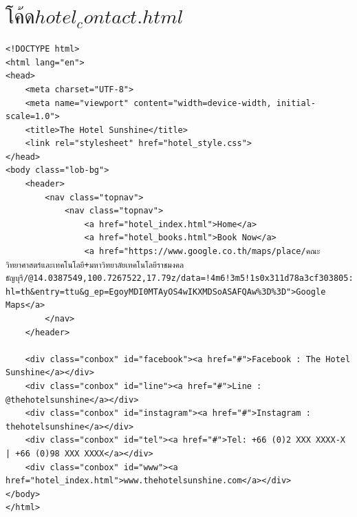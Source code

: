 \documentclass{report}
\begin{document}
\section{$โค้ดhotel_contact.html$}
\begin{verbatim}
<!DOCTYPE html>
<html lang="en">
<head>
    <meta charset="UTF-8">
    <meta name="viewport" content="width=device-width, initial-scale=1.0">
    <title>The Hotel Sunshine</title>
    <link rel="stylesheet" href="hotel_style.css">
</head>
<body class="lob-bg">
    <header>
        <nav class="topnav">
            <nav class="topnav">
                <a href="hotel_index.html">Home</a>
                <a href="hotel_books.html">Book Now</a>
                <a href="https://www.google.co.th/maps/place/คณะวิทยาศาสตร์และเทคโนโลยี+มหาวิทยาลัยเทคโนโลยีราชมงคลธัญบุรี/@14.0387549,100.7267522,17.79z/data=!4m6!3m5!1s0x311d78a3cf303805:0x298cef6207b64026!8m2!3d14.0395596!4d100.7289406!16s%2Fg%2F12nvpzlcn?hl=th&entry=ttu&g_ep=EgoyMDI0MTAyOS4wIKXMDSoASAFQAw%3D%3D">Google Maps</a>
        </nav>
    </header>

    <div class="conbox" id="facebook"><a href="#">Facebook : The Hotel Sunshine</a></div>
    <div class="conbox" id="line"><a href="#">Line : @thehotelsunshine</a></div>
    <div class="conbox" id="instagram"><a href="#">Instagram : thehotelsunshine</a></div>
    <div class="conbox" id="tel"><a href="#">Tel: +66 (0)2 XXX XXXX-X | +66 (0)98 XXX XXXX</a></div>
    <div class="conbox" id="www"><a href="hotel_index.html">www.thehotelsunshine.com</a></div>
</body>
</html>
\end{verbatim}
\end{document}
